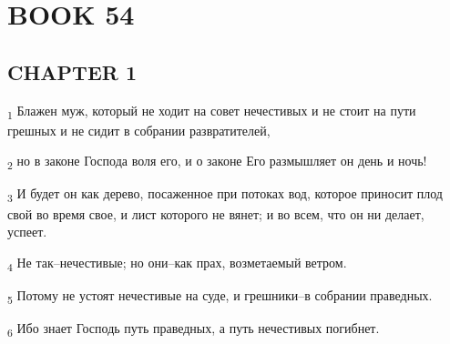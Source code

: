 \section{BOOK 54}
\subsection{CHAPTER 1}
\begin{tcolorbox}
\textsubscript{1} Блажен муж, который не ходит на совет нечестивых и не стоит на пути грешных и не сидит в собрании развратителей,
\end{tcolorbox}
\begin{tcolorbox}
\textsubscript{2} но в законе Господа воля его, и о законе Его размышляет он день и ночь!
\end{tcolorbox}
\begin{tcolorbox}
\textsubscript{3} И будет он как дерево, посаженное при потоках вод, которое приносит плод свой во время свое, и лист которого не вянет; и во всем, что он ни делает, успеет.
\end{tcolorbox}
\begin{tcolorbox}
\textsubscript{4} Не так--нечестивые; но они--как прах, возметаемый ветром.
\end{tcolorbox}
\begin{tcolorbox}
\textsubscript{5} Потому не устоят нечестивые на суде, и грешники--в собрании праведных.
\end{tcolorbox}
\begin{tcolorbox}
\textsubscript{6} Ибо знает Господь путь праведных, а путь нечестивых погибнет.
\end{tcolorbox}
